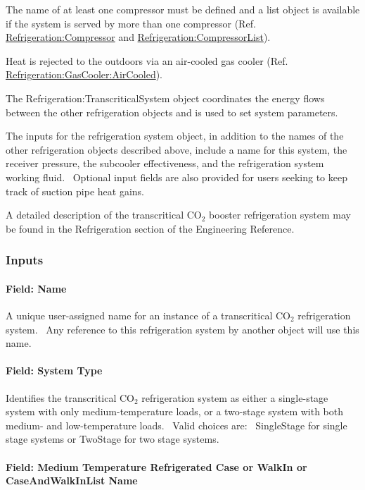 The name of at least one compressor must be defined and a list object is available if the system is served by more than one compressor (Ref. \hyperref[refrigerationcompressor]{Refrigeration:Compressor} and \hyperref[refrigerationcompressorlist]{Refrigeration:CompressorList}).

Heat is rejected to the outdoors via an air-cooled gas cooler (Ref. \hyperref[refrigerationgascooleraircooled]{Refrigeration:GasCooler:AirCooled}).

The Refrigeration:TranscriticalSystem object coordinates the energy flows between the other refrigeration objects and is used to set system parameters.

The inputs for the refrigeration system object, in addition to the names of the other refrigeration objects described above, include a name for this system, the receiver pressure, the subcooler effectiveness, and the refrigeration system working fluid.~ Optional input fields are also provided for users seeking to keep track of suction pipe heat gains.

A detailed description of the transcritical CO\(_{2}\) booster refrigeration system may be found in the Refrigeration section of the Engineering Reference.

\subsubsection{Inputs}\label{inputs-4-026}

\paragraph{Field: Name}\label{field-name-5-019}

A unique user-assigned name for an instance of a transcritical CO\(_{2}\) refrigeration system.~ Any reference to this refrigeration system by another object will use this name.

\paragraph{Field: System Type}\label{field-system-type}

Identifies the transcritical CO\(_{2}\) refrigeration system as either a single-stage system with only medium-temperature loads, or a two-stage system with both medium- and low-temperature loads.~ Valid choices are:~ SingleStage for single stage systems or TwoStage for two stage systems.

\paragraph{Field: Medium Temperature Refrigerated Case or WalkIn or CaseAndWalkInList Name}\label{field-medium-temperature-refrigerated-case-or-walkin-or-caseandwalkinlist-name}

